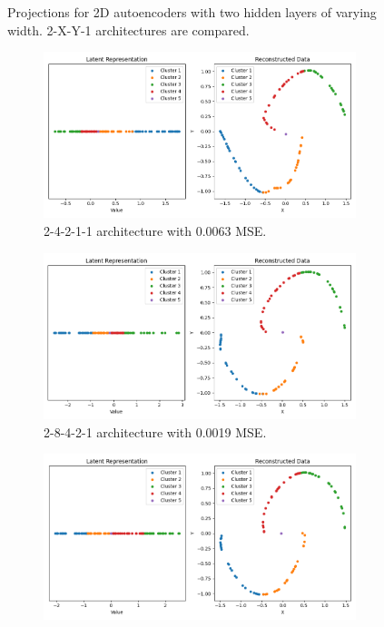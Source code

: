\begin{figure}[htb]
  \caption{Projections for 2D autoencoders with two hidden layers of varying width. 2-X-Y-1 architectures are compared.}
  \label{fig:2-X-Y-1}
\end{figure}

\begin{figure}[htb]
  \centering
  \begin{subfigure}[b]{0.49\textwidth}
    \centering
    \includegraphics[width=\linewidth]{images/RQ1/2-4-2-1-1_0.0063.png}
    \caption{2-4-2-1-1 architecture with 0.0063 MSE.}
    \label{fig:2-4-2-1-1}
  \end{subfigure}
  \hfill
  \begin{subfigure}[b]{0.49\textwidth}
    \centering
    \includegraphics[width=\linewidth]{images/RQ1/2-8-4-2-1_0.0019.png}
    \caption{2-8-4-2-1 architecture with \textcolor{green!60!black}{0.0019} MSE.}
    \label{fig:2-8-4-2-1}
  \end{subfigure}
  \hfill
  \begin{subfigure}[b]{0.49\textwidth}
    \centering
    \includegraphics[width=\linewidth]{images/RQ1/2-16-8-4-1_0.0020.png}

\end{subfigure}
\end{figure}
